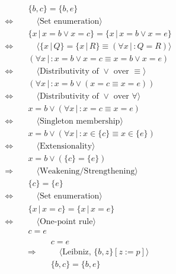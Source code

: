 \documentclass{article}
\begin{document}
    \begin{align*}
        & \quad \{b, c\} = \{b, e\} \\
        \Longleftrightarrow & \qquad \langle \text{Set enumeration} \rangle \\ 
        & \quad \{x\, |\, x = b \vee x = c\} = \{x\,|\, x=b \vee x=e\} \\
        \Longleftrightarrow & \qquad \langle \{x\,|\,Q\} =\{x\,|\,R\} \equiv (\forall x\,|\,: Q=R) \rangle \\ 
        & \quad (\forall x\,|\,: x=b \vee x=c \equiv x=b \vee x=e) \\
        \Longleftrightarrow & \qquad \langle \text{Distributivity of } \vee \text{ over } \equiv \rangle \\ 
        & \quad (\forall x\,|\,: x=b \vee (x=c \equiv x=e)) \\
        \Longleftrightarrow & \qquad \langle \text{Distributivity of } \vee \text{ over } \forall \rangle \\ 
        & \quad x=b \vee (\forall x\,|\,: x=c \equiv x=e) \\
        \Longleftrightarrow & \qquad \langle \text{Singleton membership} \rangle \\ 
        & \quad x=b \vee (\forall x\,|\,: x \in \{c\} \equiv x \in \{e\}) \\
        \Longleftrightarrow & \qquad \langle \text{Extensionality} \rangle \\ 
        & \quad x=b \vee (\{c\} = \{e\}) \\
        \Longrightarrow & \qquad \langle \text{Weakening/Strengthening} \rangle \\ 
        & \quad \{c\} = \{e\} \\
        \Longleftrightarrow & \qquad \langle \text{Set enumeration} \rangle \\ 
        & \quad \{x\,|\, x=c\} = \{x\,|\, x=e\} \\
        \Longleftrightarrow & \qquad \langle \text{One-point rule} \rangle \\ 
        & \quad c = e \\
    \end{align*}
    \begin{align*}
        & \quad c = e \\
        \Longrightarrow & \qquad \langle \text{Leibniz, } \{b, z\}[z := p]\rangle \\ 
        & \quad \{b,c\} = \{b,e\} \\
    \end{align*}
\end{document}
